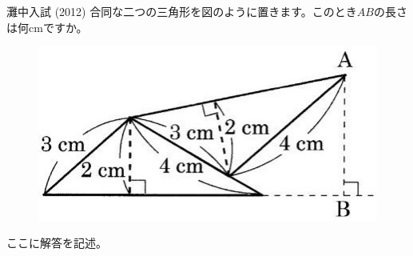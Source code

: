 \begin{thm}{13}{}{灘中入試 (2012)}
 合同な二つの三角形を図のように置きます。このとき$AB$の長さは何cmですか。
 \begin{figure}[H]
  \centering
  \includegraphics[bb=0 0 326 167,width=0.7\linewidth]{./problems/Q_013/Q_013.jpg}
 \end{figure}
\end{thm}

ここに解答を記述。